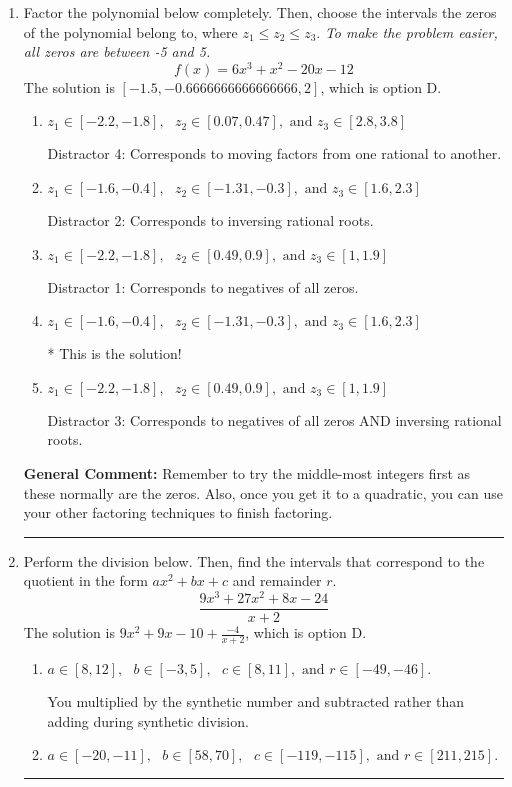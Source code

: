 \documentclass{extbook}[14pt]
\newcommand{\litem}[1]{\item #1

\rule{\textwidth}{0.4pt}}
\begin{document}
\begin{enumerate}\litem{
Factor the polynomial below completely. Then, choose the intervals the zeros of the polynomial belong to, where $z_1 \leq z_2 \leq z_3$. \textit{To make the problem easier, all zeros are between -5 and 5.}
\[ f(x) = 6x^{3} + x^{2} -20 x -12 \]The solution is \( [-1.5, -0.6666666666666666, 2] \), which is option D.\begin{enumerate}[label=\Alph*.]
\item \( z_1 \in [-2.2, -1.8], \text{   }  z_2 \in [0.07, 0.47], \text{   and   } z_3 \in [2.8, 3.8] \)

 Distractor 4: Corresponds to moving factors from one rational to another.
\item \( z_1 \in [-1.6, -0.4], \text{   }  z_2 \in [-1.31, -0.3], \text{   and   } z_3 \in [1.6, 2.3] \)

 Distractor 2: Corresponds to inversing rational roots.
\item \( z_1 \in [-2.2, -1.8], \text{   }  z_2 \in [0.49, 0.9], \text{   and   } z_3 \in [1, 1.9] \)

 Distractor 1: Corresponds to negatives of all zeros.
\item \( z_1 \in [-1.6, -0.4], \text{   }  z_2 \in [-1.31, -0.3], \text{   and   } z_3 \in [1.6, 2.3] \)

* This is the solution!
\item \( z_1 \in [-2.2, -1.8], \text{   }  z_2 \in [0.49, 0.9], \text{   and   } z_3 \in [1, 1.9] \)

 Distractor 3: Corresponds to negatives of all zeros AND inversing rational roots.
\end{enumerate}

\textbf{General Comment:} Remember to try the middle-most integers first as these normally are the zeros. Also, once you get it to a quadratic, you can use your other factoring techniques to finish factoring.
}
\litem{
Perform the division below. Then, find the intervals that correspond to the quotient in the form $ax^2+bx+c$ and remainder $r$.
\[ \frac{9x^{3} +27 x^{2} +8 x -24}{x + 2} \]The solution is \( 9x^{2} +9 x -10 + \frac{-4}{x + 2} \), which is option D.\begin{enumerate}[label=\Alph*.]
\item \( a \in [8, 12], \text{   } b \in [-3, 5], \text{   } c \in [8, 11], \text{   and   } r \in [-49, -46]. \)

 You multiplied by the synthetic number and subtracted rather than adding during synthetic division.
\item \( a \in [-20, -11], \text{   } b \in [58, 70], \text{   } c \in [-119, -115], \text{   and   } r \in [211, 215]. \)


\end{enumerate}}
\end{enumerate}
\end{document}
